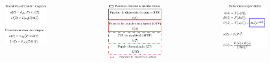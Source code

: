 \documentclass[xcolor=table,serif]{beamer}
\begin{document}
{\begin{columns}
  \begin{figure}
    \includegraphics[scale =.85]{Figures/presentation/transformations.pdf}
  \end{figure}
  \pause
  \begin{figure}
    \includegraphics[scale =.85]{Figures/presentation/definitions.pdf}
  \end{figure}
  \pause
  \begin{figure}
    \includegraphics[scale =.85]{Figures/presentation/relations.pdf}
  \end{figure}
\end{columns}
}
\end{document}
